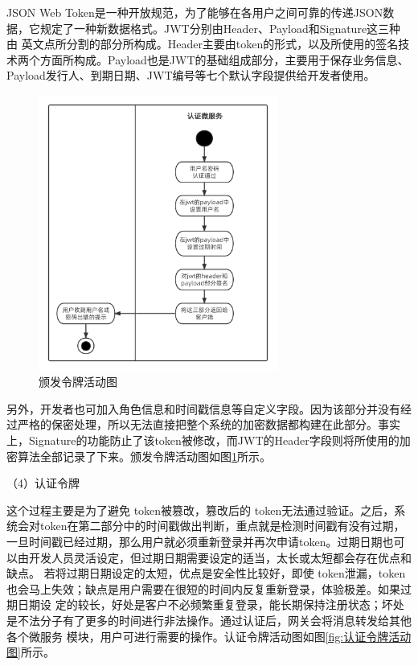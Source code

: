 JSON Web Token是一种开放规范，为了能够在各用户之间可靠的传递JSON数据，它规定了一种新数据格式。JWT分别由Header、Payload和Signature这三种由
英文点所分割的部分所构成。Header主要由token的形式，以及所使用的签名技术两个方面所构成。Payload也是JWT的基础组成部分，主要用于保存业务信息、
Payload发行人、到期日期、JWT编号等七个默认字段提供给开发者使用。
\begin{figure}[htb]
    \centering
    \includegraphics[width=0.7\textwidth]{my_figures/chapter4/颁发令牌活动图.png}
    \caption{颁发令牌活动图}
    \label{fig:颁发令牌活动图}
\end{figure}
另外，开发者也可加入角色信息和时间戳信息等自定义字段。因为该部分并没有经过严格的保密处理，所以无法直接把整个系统的加密数据都构建在此部分。事实
上，Signature的功能防止了该token被修改，而JWT的Header字段则将所使用的加密算法全部记录了下来。颁发令牌活动图如图\ref{fig:颁发令牌活动图}所示。


（4）认证令牌

这个过程主要是为了避免 token被篡改，篡改后的 token无法通过验证。之后，系统会对token在第二部分中的时间戳做出判断，重点就是检测时间戳有没有过期，
一旦时间戳已经过期，那么用户就必须重新登录并再次申请token。过期日期也可以由开发人员灵活设定，但过期日期需要设定的适当，太长或太短都会存在优点和缺点。
若将过期日期设定的太短，优点是安全性比较好，即使 token泄漏，token也会马上失效；缺点是用户需要在很短的时间内反复重新登录，体验极差。如果过期日期设
定的较长，好处是客户不必频繁重复登录，能长期保持注册状态；坏处是不法分子有了更多的时间进行非法操作。通过认证后，网关会将消息转发给其他各个微服务
模块，用户可进行需要的操作。认证令牌活动图如图\ref{fig:认证令牌活动图}所示。

